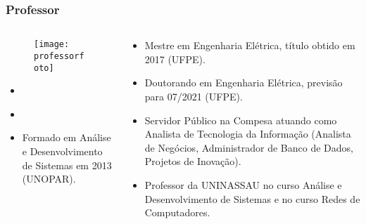 \begin{frame}[t]\frametitle{Professor}

  \begin{columns}

    \begin{column}{0.5\linewidth}
      \begin{figure}[htb]
        \centering{}
        \texttt{[image: \\professorfoto]}

        \textbf{\href{\professorlattes}{\professor}}
      \end{figure}

      \begin{itemize}
        \justifying{}
        \setlength\itemsep{1em}
        \item \href{\professorsite}{\professorsite}
        \item \href{\professorlattes}{\professorlattes}
        \item Formado em Análise e Desenvolvimento de Sistemas em 2013 (UNOPAR).
      \end{itemize}
    \end{column}

    \begin{column}{0.5\linewidth}
      \begin{itemize}
      \justifying{}
      \setlength\itemsep{1em}
      \item Mestre em Engenharia Elétrica, título obtido em 2017 (UFPE).
      \item Doutorando em Engenharia Elétrica, previsão para 07/2021 (UFPE).
      \item Servidor Público na Compesa atuando como Analista de Tecnologia da Informação (Analista de Negócios, Administrador de Banco de Dados, Projetos de Inovação).
      \item Professor da UNINASSAU no curso Análise e Desenvolvimento de Sistemas e no curso Redes de Computadores.
      \end{itemize}
    \end{column}

  \end{columns}

\end{frame}
